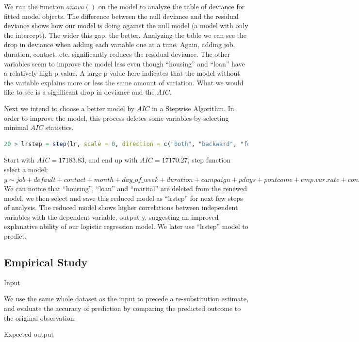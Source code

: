\documentclass[12pt, a4paper, bibliography=totoc, english]{scrartcl}
\begin{document}
We run the function $anova( )$ on the model to analyze the table of deviance for fitted model objects. The difference between the null deviance and the residual deviance shows how our model is doing against the null model (a model with only the intercept). The wider this gap, the better. Analyzing the table we can see the drop in deviance when adding each variable one at a time. Again, adding job, duration, contact, etc. significantly reduces the residual deviance.  The other variables seem to improve the model less even though “housing” and “loan” have a relatively high p-value. A large p-value here indicates that the model without the variable explains more or less the same amount of variation. What we would like to see is a significant drop in deviance and the $AIC$.

Next we intend to choose a better model by $AIC$ in a Stepwise Algorithm. In order to improve the model, this process deletes some variables by selecting minimal $AIC$ statistics.

\begin{lstlisting}[language = R]
20 > lrstep = step(lr, scale = 0, direction = c("both", "backward", "forward"), trace = 1,keep = NULL, steps = 1000, k = 2) 
\end{lstlisting}

Start with $AIC=17183.83$, and end up with $AIC=17170.27$, step function select a model: $y \sim job + default + contact + month + day\_of\_week + duration + campaign + pdays + poutcome + emp.var.rate + cons.price.idx + cons.conf.idx + euribor3m + nr.employed.$ We can notice that “housing”, “loan” and “marital” are deleted from the renewed model, we then select and save this reduced model as “lrstep” for next few steps of analysis. The reduced model shows higher correlations between independent variables with the dependent variable, output y, suggesting an improved explanative ability of our logistic regression model. We later use “lrstep” model to predict.

\subsection{Empirical Study}
\textbullet\quad Input

We use the same whole dataset as the input to precede a re-substitution estimate, and evaluate the accuracy of prediction by comparing the predicted outcome to the original observation. 


\textbullet\quad Expected output 
\end{document}
